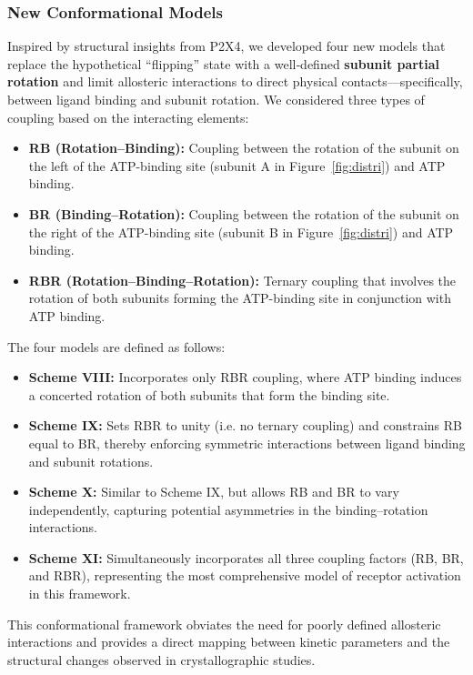 \documentclass[9pt]{elife}
\begin{document}
	\subsubsection{New Conformational Models}
	
	Inspired by structural insights from P2X4, we developed four new models that replace the hypothetical “flipping” state with a well‐defined \textbf{subunit partial rotation} and limit allosteric interactions to direct physical contacts—specifically, between ligand binding and subunit rotation. We considered three types of coupling based on the interacting elements:
	
	\begin{itemize}
		\item \textbf{RB (Rotation–Binding):} Coupling between the rotation of the subunit on the left of the ATP-binding site (subunit A in Figure~\ref{fig:distri}) and ATP binding.
		\item \textbf{BR (Binding–Rotation):} Coupling between the rotation of the subunit on the right of the ATP-binding site (subunit B in Figure~\ref{fig:distri}) and ATP binding.
		\item \textbf{RBR (Rotation–Binding–Rotation):} Ternary coupling that involves the rotation of both subunits forming the ATP-binding site in conjunction with ATP binding.
	\end{itemize}
	
	The four models are defined as follows:
	
	\begin{itemize}
		\item \textbf{Scheme VIII:} Incorporates only RBR coupling, where ATP binding induces a concerted rotation of both subunits that form the binding site.
		\item \textbf{Scheme IX:} Sets RBR to unity (i.e. no ternary coupling) and constrains RB equal to BR, thereby enforcing symmetric interactions between ligand binding and subunit rotations.
		\item \textbf{Scheme X:} Similar to Scheme IX, but allows RB and BR to vary independently, capturing potential asymmetries in the binding–rotation interactions.
		\item \textbf{Scheme XI:} Simultaneously incorporates all three coupling factors (RB, BR, and RBR), representing the most comprehensive model of receptor activation in this framework.
	\end{itemize}
	
	This conformational framework obviates the need for poorly defined allosteric interactions and provides a direct mapping between kinetic parameters and the structural changes observed in crystallographic studies.
\end{document}

